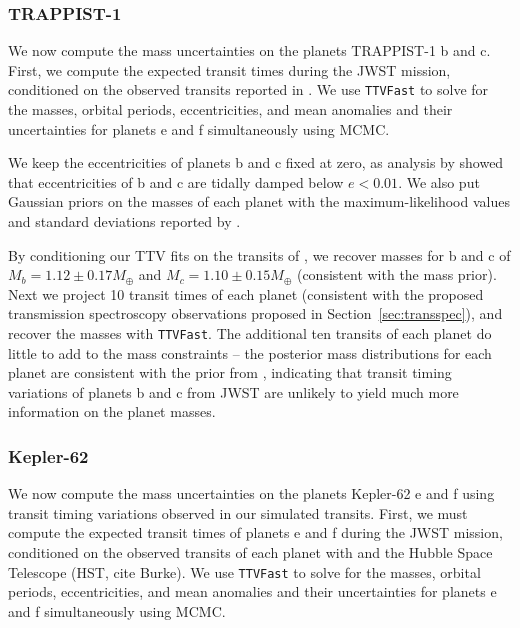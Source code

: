 \subsubsection{TRAPPIST-1}


We now compute the mass uncertainties on the planets TRAPPIST-1 b and c. First, we compute the expected transit times during the JWST mission, conditioned on the observed transits reported in \citet{Grimm2018}. We use \texttt{TTVFast} to solve for the masses, orbital periods, eccentricities, and mean anomalies and their uncertainties for planets e and f simultaneously using MCMC. 

We keep the eccentricities of planets b and c fixed at zero, as analysis by \citet{Luger2017} showed that eccentricities of b and c are tidally damped below $e < 0.01$. We also put Gaussian priors on the masses of each planet with the maximum-likelihood values and standard deviations reported by \citet{Grimm2018}.

By conditioning our TTV fits on the transits of \citet{Grimm2018}, we recover masses for b and c of $M_b = 1.12 \pm 0.17 M_\oplus$ and $M_c = 1.10 \pm 0.15 M_\oplus$ (consistent with the mass prior). Next we project 10 transit times of each planet (consistent with the proposed transmission spectroscopy observations proposed in Section~\ref{sec:transspec}), and recover the masses with \texttt{TTVFast}. The additional ten transits of each planet do little to add to the mass constraints -- the posterior mass distributions for each planet are consistent with the prior from \citet{Grimm2018}, indicating that transit timing variations of planets b and c from JWST are unlikely to yield much more information on the planet masses.  %

\subsubsection{Kepler-62}

We now compute the mass uncertainties on the planets Kepler-62 e and f using transit timing variations observed in our simulated transits. First, we must compute the expected transit times of planets e and f during the JWST mission, conditioned on the observed transits of each planet with \kepler and the Hubble Space Telescope (HST, cite Burke). We use \texttt{TTVFast} to solve for the masses, orbital periods, eccentricities, and mean anomalies and their uncertainties for planets e and f simultaneously using MCMC. 

